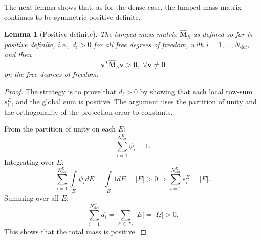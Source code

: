 \documentclass{article}
\newtheorem{lemma}{Lemma}[section]
\newcommand{\M}{\hat{\mathbf{M}}_h}
\newcommand{\integral}[1]{\int \limits_{#1}}
\newcommand{\numdofs}{N^E_{\text{dof}}}
\begin{document}
The next lemma shows that, as for the dense case, the lumped mass matrix continues to be symmetric positive definite.
\begin{lemma}[Positive definite]\label{lemma:spd}
    The lumped mass matrix $\M$ as defined so far is positive definite, i.e., $d_i > 0$ for all free degrees of freedom, with $i=1,...,N_{\text{dof}}$, and then
    \begin{equation}
        \nonumber
        \mathbf{v}^T\M \mathbf{v} > \mathbf{0}, \; \forall \mathbf{v} \neq \mathbf{0}
    \end{equation}
    on the free degrees of freedom.
\end{lemma}

\begin{proof}
    The strategy is to prove that $d_i > 0$ by showing that each local row-sum $s^E_i$, and the global sum is positive. The argument uses the partition of unity and the orthogonality of the projection error to constants.

    From the partition of unity on each $E$:
    \begin{equation}
        \nonumber
        \sum \limits^{\numdofs}_{i=1} \psi_i = 1.
    \end{equation}
    Integrating over $E$:
    \begin{equation}
        \nonumber
        \sum \limits^{\numdofs}_{i=1} \integral{E}\psi_i dE = \integral{E} 1 dE = |E| > 0 \Rightarrow \sum \limits^{\numdofs}_{i=1} s^E_i = |E|.
    \end{equation}
    Summing over all $E$:
    \begin{equation}
        \nonumber
        \sum \limits^{\numdofs}_{i=1} d_i = \sum \limits_{E \in \mathcal{T}_h} |E| = |\Omega| > 0.
    \end{equation}
    This shows that the total mass is positive.


\end{proof}
\end{document}
